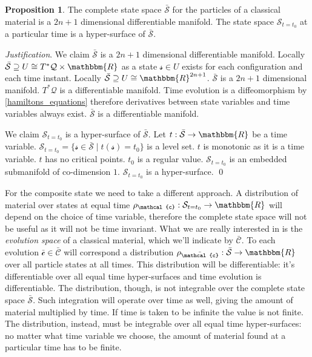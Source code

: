 \documentclass[aps,pra,10pt,twocolumn,floatfix,nofootinbib]{revtex4-1}
\numberwithin{equation}{section}
\theoremstyle{definition}
\newtheorem{prop}[equation]{Proposition}
\newenvironment{justification}{\emph{Justification}.}{\qed}
\begin{document}
\begin{prop}\label{complete_particle_state_space}
	The complete state space $\bar{\mathcal{S}}$ for the particles of a classical material is a $2n+1$ dimensional differentiable manifold. The state space $\mathcal{S}_{t=t_0}$ at a particular time is a hyper-surface of $\bar{\mathcal{S}}$.
\end{prop}

\begin{justification}
	We claim $\bar{\mathcal{S}}$ is a $2n+1$ dimensional differentiable manifold. Locally $\bar{\mathcal{S}} \supseteq U \cong T^*\mathcal{Q}\times \mathbbm{R}$ as a state $\mathcal{s} \in U$ exists for each configuration and each time instant. Locally $\bar{\mathcal{S}} \supseteq U \cong\mathbbm{R}^{2n+1}$. $\bar{\mathcal{S}}$ is a $2n+1$ dimensional manifold. $T^*\mathcal{Q}$ is a differentiable manifold. Time evolution is a diffeomorphism by \ref{hamiltons_equations} therefore derivatives between state variables and time variables always exist. $\bar{\mathcal{S}}$ is a differentiable manifold.
	
	We claim $\mathcal{S}_{t=t_0}$ is a hyper-surface of $\bar{\mathcal{S}}$. Let $t : \bar{\mathcal{S}} \rightarrow \mathbbm{R}$ be a time variable. $\mathcal{S}_{t=t_0} = \{ \mathcal{s} \in \bar{\mathcal{S}} \; | \; t(\mathcal{s}) = t_0 \}$ is a level set. $t$ is monotonic as it is a time variable. $t$ has no critical points. $t_0$ is a regular value. $\mathcal{S}_{t=t_0}$ is an embedded submanifold of co-dimension $1$. $\mathcal{S}_{t=t_0}$ is a hyper-surface.
\end{justification}

For the composite state we need to take a different approach. A distribution of material over states at equal time $\rho_\mathcal{c} : \mathcal{S}_{t=t_0} \rightarrow \mathbbm{R}$ will depend on the choice of time variable, therefore the complete state space will not be useful as it will not be time invariant. What we are really interested in is the \emph{evolution space} of a classical material, which we'll indicate by $\bar{\mathcal{C}}$. To each evolution $\bar{\mathcal{c}} \in \bar{\mathcal{C}}$ will correspond a distribution $\rho_{\bar{\mathcal{c}}} : \bar{\mathcal{S}} \rightarrow \mathbbm{R}$ over all particle states at all times. This distribution will be differentiable: it's differentiable over all equal time hyper-surfaces and time evolution is differentiable. The distribution, though, is not integrable over the complete state space $\bar{\mathcal{S}}$. Such integration will operate over time as well, giving the amount of material multiplied by time. If time is taken to be infinite the value is not finite. The distribution, instead, must be integrable over all equal time hyper-surfaces: no matter what time variable we choose, the amount of material found at a particular time has to be finite.
\end{document}
